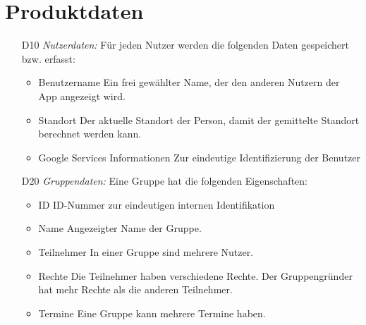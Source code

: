 \documentclass{scrartcl}
\begin{document}
	
	\newpage
	
	
	\section{Produktdaten}
	\begin{itemize}
		\item [D10] \textit{Nutzerdaten:}
		Für jeden Nutzer werden die folgenden Daten gespeichert bzw. erfasst:
		\begin{itemize}
			\item Benutzername
			\newline Ein frei gewählter Name, der den anderen Nutzern der App angezeigt wird.
			\item Standort
			\newline Der aktuelle Standort der Person, damit der gemittelte Standort berechnet werden kann.
			\item Google Services Informationen
			\newline Zur eindeutige Identifizierung der Benutzer
		\end{itemize}
		
		\item [D20] \textit{Gruppendaten:}
		Eine Gruppe hat die folgenden Eigenschaften:
		\begin{itemize}
			\item ID
			\newline ID-Nummer zur eindeutigen internen Identifikation
			\item Name
			\newline Angezeigter Name der Gruppe.
			\item Teilnehmer
			\newline In einer Gruppe sind mehrere Nutzer.
			\item Rechte
			\newline Die Teilnehmer haben verschiedene Rechte. Der Gruppengründer hat mehr Rechte als die anderen Teilnehmer.
			\item Termine
			\newline Eine Gruppe kann mehrere Termine haben.
		\end{itemize}
		

\end{itemize}
\end{document}
